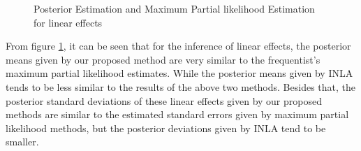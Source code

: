 \documentclass[]{article}
\begin{document}
\begin{figure}[ht]
\centering
{}
\caption{Posterior Estimation and Maximum Partial likelihood Estimation for linear effects}
\label{fig:BladderLinearEff}
\end{figure}

From figure \ref{fig:BladderLinearEff}, it can be seen that for the inference of linear effects, the posterior means given by our proposed method are very similar to the frequentist's maximum partial likelihood estimates. While the posterior means given by INLA tends to be less similar to the results of the above two methods. Besides that, the posterior standard deviations of these linear effects given by our proposed methods are similar to the estimated standard errors given by maximum partial likelihood methods, but the posterior deviations given by INLA tend to be smaller.
\end{document}
